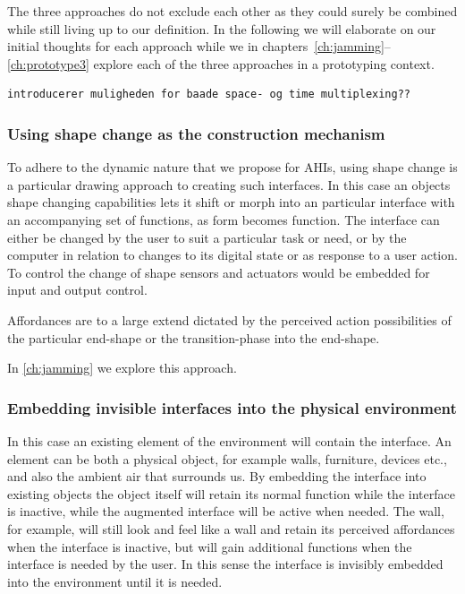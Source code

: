 The three approaches do not exclude each other as they could surely be combined while still living up to our definition.
In the following we will elaborate on our initial thoughts for each approach while we in chapters~\autoref{ch:jamming}--\ref{ch:prototype3}  explore each of the three approaches in a prototyping context.
 
\begin{verbatim}
introducerer muligheden for baade space- og time multiplexing??
\end{verbatim}

\subsubsection{Using shape change as the construction mechanism}
To adhere to the dynamic nature that we propose for AHIs, using shape change is a particular drawing approach to creating such interfaces.
In this case an objects shape changing capabilities lets it shift or morph into an particular interface with an accompanying set of functions, as form becomes function.
The interface can either be changed by the user to suit a particular task or need, or by the computer in relation to changes to its digital state or as response to a user action.
To control the change of shape sensors and actuators would be embedded for input and output control.

Affordances are to a large extend dictated by the perceived action possibilities of the particular end-shape or the transition-phase into the end-shape.

In \autoref{ch:jamming} we explore this approach.

\subsubsection{Embedding invisible interfaces into the physical environment}
In this case an existing element of the environment will contain the interface.
An element can be both a physical object, for example walls, furniture, devices etc., and also the ambient air  that surrounds us.
By embedding the interface into existing objects the object itself will retain its normal function while the interface is inactive, while the augmented interface will be active when needed. 
The wall, for example, will still look and feel like a wall and retain its perceived affordances when the interface is inactive, but will gain additional functions when the interface is needed by the user.
In this sense the interface is invisibly embedded into the environment until it is needed.

